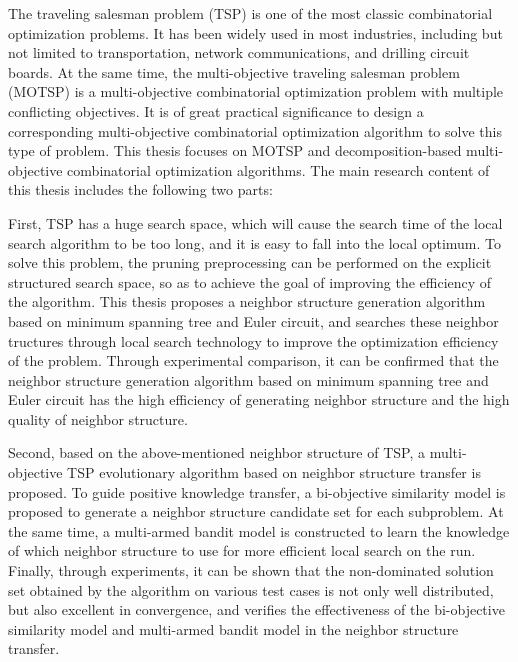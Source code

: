 \begin{abstractEn}
\label{abstractEn} 
    The traveling salesman problem (TSP) is one of the most classic combinatorial optimization problems. It has been widely used in most industries, including but not limited to transportation, network communications, and drilling circuit boards. At the same time, the multi-objective traveling salesman problem (MOTSP) is a multi-objective combinatorial optimization problem with multiple conflicting objectives. It is of great practical significance to design a corresponding multi-objective combinatorial optimization algorithm to solve this type of problem. This thesis focuses on MOTSP ​​and decomposition-based multi-objective combinatorial optimization algorithms.
    The main research content of this thesis includes the following two parts:
    \par
    First, TSP has a huge search space, which will cause the search time of the local search algorithm to be too long, and it is easy to fall into the local optimum. To solve this problem, the pruning preprocessing can be performed on the explicit structured search space, so as to achieve the goal of improving the efficiency of the algorithm. This thesis proposes a neighbor structure generation algorithm based on minimum spanning tree and Euler circuit, and searches these neighbor tructures through local search technology to improve the optimization efficiency of the problem. Through experimental comparison, it can be confirmed that the neighbor structure generation algorithm based on minimum spanning tree and Euler circuit has the high efficiency of generating neighbor structure and the high quality of neighbor structure.
    \par
    Second, based on the above-mentioned neighbor structure of TSP, a multi-objective TSP evolutionary algorithm based on neighbor structure transfer is proposed. To guide positive knowledge transfer, a bi-objective similarity model is proposed to generate a neighbor structure candidate set for each subproblem. At the same time, a multi-armed bandit model is constructed to learn the knowledge of which neighbor structure to use for more efficient local search on the run. Finally, through experiments, it can be shown that the non-dominated solution set obtained by the algorithm on various test cases is not only well distributed, but also excellent in convergence, and verifies the effectiveness of the bi-objective similarity model and multi-armed bandit model in the neighbor structure transfer.
\end{abstractEn}
